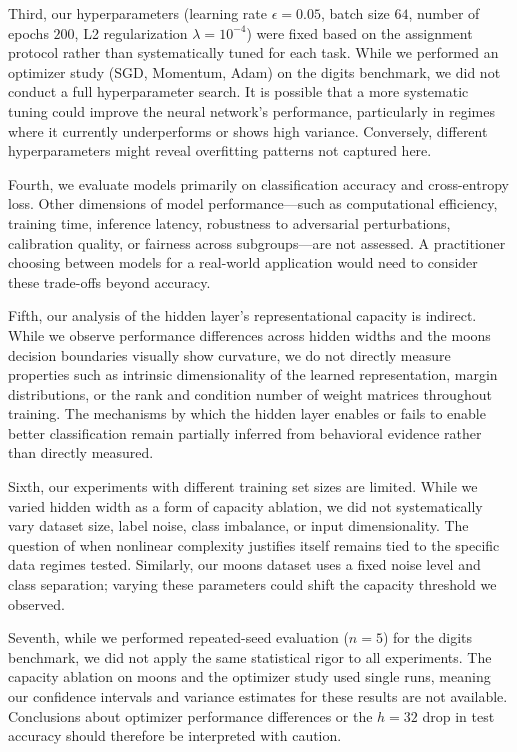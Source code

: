 \documentclass[11pt]{article}
\begin{document}
Third, our hyperparameters (learning rate $\epsilon = 0.05$, batch size $64$, number of epochs $200$, L2 regularization $\lambda = 10^{-4}$) were fixed based on the assignment protocol rather than systematically tuned for each task. While we performed an optimizer study (SGD, Momentum, Adam) on the digits benchmark, we did not conduct a full hyperparameter search. It is possible that a more systematic tuning could improve the neural network's performance, particularly in regimes where it currently underperforms or shows high variance. Conversely, different hyperparameters might reveal overfitting patterns not captured here.

Fourth, we evaluate models primarily on classification accuracy and cross-entropy loss. Other dimensions of model performance—such as computational efficiency, training time, inference latency, robustness to adversarial perturbations, calibration quality, or fairness across subgroups—are not assessed. A practitioner choosing between models for a real-world application would need to consider these trade-offs beyond accuracy.

Fifth, our analysis of the hidden layer's representational capacity is indirect. While we observe performance differences across hidden widths and the moons decision boundaries visually show curvature, we do not directly measure properties such as intrinsic dimensionality of the learned representation, margin distributions, or the rank and condition number of weight matrices throughout training. The mechanisms by which the hidden layer enables or fails to enable better classification remain partially inferred from behavioral evidence rather than directly measured.

Sixth, our experiments with different training set sizes are limited. While we varied hidden width as a form of capacity ablation, we did not systematically vary dataset size, label noise, class imbalance, or input dimensionality. The question of when nonlinear complexity justifies itself remains tied to the specific data regimes tested. Similarly, our moons dataset uses a fixed noise level and class separation; varying these parameters could shift the capacity threshold we observed.

Seventh, while we performed repeated-seed evaluation ($n=5$) for the digits benchmark, we did not apply the same statistical rigor to all experiments. The capacity ablation on moons and the optimizer study used single runs, meaning our confidence intervals and variance estimates for these results are not available. Conclusions about optimizer performance differences or the $h=32$ drop in test accuracy should therefore be interpreted with caution.
\end{document}
